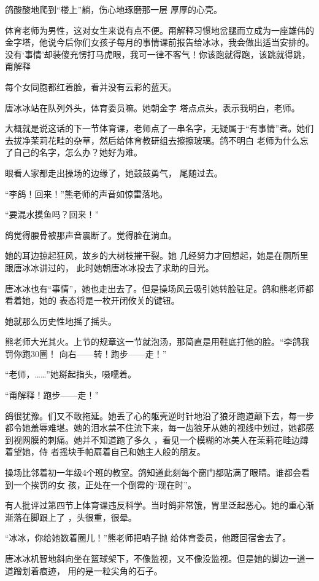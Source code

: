 \documentclass{article}
\begin{document}
鸽酸酸地爬到“楼上”躺，伤心地琢磨那一层
厚厚的心壳。 

体育老师为男性，这对女生来说有点不便。甭解释习惯地岔腿而立成为一座雄伟的金字塔，他说今后你们女孩子每月的事情课前报告给冰冰，我会做出适当安排的。没有‘事情’却装傻充愣打马虎眼，我可一律不客气！你该跑就得跑，该跳就得跳，甭解释
\newpage


每个女同胞都红着脸，看并没有云彩的蓝天。

唐冰冰站在队列外头，体育委员嘛。她朝金字
塔点点头，表示我明白，老师。 

大概就是说这话的下一节体育课，老师点了一串名字，无疑属于“有事情”者。她们去拔净茉莉花畦的杂草，然后给体育教研组去擦擦玻璃。鸽不明白
老师为什么忘了自己的名字，怎么办？她好为难。 

眼看人家都走出操场的边缘了，她鼓鼓勇气，
尾随过去。 

“李鸽！回来！”熊老师的声音如惊雷落地。


“要混水摸鱼吗？回来！” 

鸽觉得腰骨被那声音震断了。觉得脸在淌血。

她的耳边掠起狂风，故乡的大树枝摧干裂。她
\newpage
几经努力才回想起，她是在厕所里跟唐冰冰讲过的，
此时她朝唐冰冰投去了求助的目光。 

唐冰冰也有“事情”，她也走出去了。但是操场风云吸引她转脸驻足。鸽和熊老师都看着她，她的
表态将是一枚开闭攸关的键钮。 


她就那么历史性地摇了摇头。 

熊老师大光其火。上节的规章这一节就泡汤，那简直是用鞋底打他的脸。“李鸽我罚你跑30圈！
 向右——转！跑步——走！” 


“老师，……”她掰起指头，嗫嚅着。 


“甭解释！跑步——走！” 

鸽很犹豫。们又不敢拖延。她丢了心的躯壳逆时针地沿了狼牙跑道颠下去，每一步都令她羞辱难堪。她的泪水禁不住流下来，每一齿狼牙从她的视线中划过，她都感到视网膜的刺痛。她并不知道跑了多久
\newpage
，看见一个模糊的冰美人在茉莉花畦边蹲着望她，侍
者摇块手帕扇着自己和她主人般的朋友。 

操场比邻着初一年级4个班的教室。鸽知道此刻每个窗门都贴满了眼睛。谁都会看到一个挨罚的女
孩，正处在一个倒霉的“现在时”。 

有人批评过第四节上体育课违反科学。当时鸽非常饿，胃里泛起恶心。她的重心渐渐落在脚跟上了
，头很重，很晕。 

“冰冰，你给她数着圈儿！”熊老师把哨子抛
给体育委员，他踱回宿舍去了。 

唐冰冰机智地斜向坐在篮球架下，不像监视，又不像没监视。但是她的脚边一道一道蹭划着痕迹，
用的是一粒尖角的石子。 
\end{document}
